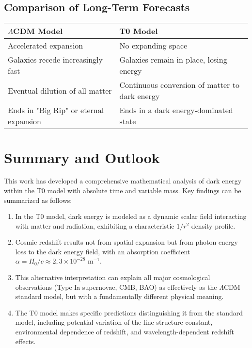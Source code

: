 \documentclass[a4paper,12pt]{article}
\theoremstyle{definition}
\theoremstyle{remark}
\begin{document}
	\subsection{Comparison of Long-Term Forecasts}
	\begin{tcolorbox}[colback=yellow!5!white,colframe=yellow!75!black,title=Long-Term Evolution of the Universe]
		\begin{tabular}{|p{}|p{}|}
			\hline
			\textbf{$\Lambda$CDM Model} & \textbf{T0 Model} \\
			\hline
			Accelerated expansion & No expanding space \\
			\hline
			Galaxies recede increasingly fast & Galaxies remain in place, losing energy \\
			\hline
			Eventual dilution of all matter & Continuous conversion of matter to dark energy \\
			\hline
			Ends in "Big Rip" or eternal expansion & Ends in a dark energy-dominated state \\
			\hline
		\end{tabular}
	\end{tcolorbox}
	
	\section{Summary and Outlook}
	This work has developed a comprehensive mathematical analysis of dark energy within the T0 model with absolute time and variable mass. Key findings can be summarized as follows:
	
	\begin{enumerate}
		\item In the T0 model, dark energy is modeled as a dynamic scalar field interacting with matter and radiation, exhibiting a characteristic $1/r^2$ density profile.
		\item Cosmic redshift results not from spatial expansion but from photon energy loss to the dark energy field, with an absorption coefficient $\alpha = H_0/c \approx 2{,}3 \times 10^{-28} \text{ m}^{-1}$.
		\item This alternative interpretation can explain all major cosmological observations (Type Ia supernovae, CMB, BAO) as effectively as the $\Lambda$CDM standard model, but with a fundamentally different physical meaning.
		\item The T0 model makes specific predictions distinguishing it from the standard model, including potential variation of the fine-structure constant, environmental dependence of redshift, and wavelength-dependent redshift effects.
	\end{enumerate}
	
\end{document}
